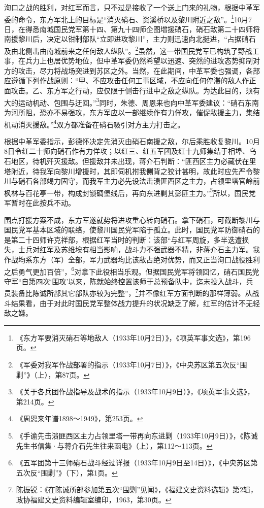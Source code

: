 洵口之战的胜利，对红军而言，只不过是接收了一个送上门来的礼物，根据中革军委的命令，东方军北上的目标是“消灭硝石、资溪桥以及黎川附近之敌”。\footnote{《东方军要消灭硝石等地敌人（1933年10月2日）》，《项英军事文选》，第196页。}10月7日，在得悉南城国民党军第十四、第九十四师企图增援硝石，硝石敌第二十四师将南援黎川后，决定以钳制部队“立即进攻黎川”，主力则迅速向北挺进，“占据硝石及由北侧击由南城前来之任何敌人纵队”。\footnote{《军委对我军作战部署的指示（1933年10月7日）》，《中央苏区第五次反“围剿”》（上），第87页。}虽然，这一带国民党军已构筑了野战工事，在兵力上也居优势地位，但中革军委仍然希望以迅速、突然的进攻态势抑制对方的攻击，尽力将战场突进到苏区之外。当然，在此期间，中革军委也强调，各部应遵循下列作战原则：“甲、不应攻击任何工事区域，不应向任何停滞的敌人作正面攻击。乙、东方军之行动，应仅限于侧击行进中之敌之纵队。为达此目的，须有大的运动机动、包围与迂回。”\footnote{《关于各兵团作战指导及战术的指示（1933年10月9日）》，《项英军事文选》，第214页。}同时，朱德、周恩来也向中革军委建议：“硝石东南为河所阻，恐亦不易强攻，东方军应以一部继续作有力佯攻，催促敌援主力，集结机动消灭援敌。”\footnote{《周恩来年谱1898～1949》，第253页。}双方都准备在硝石吸引对方主力打击之。


根据中革军委指示，彭德怀决定先消灭由硝石南援之敌，尔后乘胜收复黎川。10月8日令红二十师向硝石作有力佯攻；以红三、红五军团及红十九师集结于相埠、乌石地区，待机歼灭援敌。但援敌并未出现，蒋介石判断：“匪西区主力必藏伏在里塔附近，待我军向黎川增援时，其即伺机拊我侧背之狡计甚明，故此时应先严令黎川与硝石各部竭力固守，而我军主力必先设法击溃匪西区之主力，占领里塔官岭前枫林与百花亭一带，构成封锁碉堡线后，再向东进剿其彭匪主力。”\footnote{《手谕先击溃匪西区主力占领里塔一带再向东进剿（1933年10月9日）》，《陈诚先生书信集·与蒋介石先生往来函电》（上），第112～113页。}所以，国民党军暂时在此按兵不动。


围点打援方案不成，东方军遂就势将进攻重心转向硝石。拿下硝石，可截断黎川与国民党军基本区域的联络，使黎川国民党军陷于孤立。此时，国民党军防御硝石的是第二十四师许克祥部，根据红军当时的判断：该部“与红军周旋，多半迭遭损失，士兵对红军及苏维埃有相当影响，战斗力不强武器不精，非蒋介石主力军。我作战均系东方（军）全部，军力武器均比该敌占绝对优势，而又正当洵口战役胜利之后勇气更加百倍”，\footnote{《五军团第十三师硝石战斗经过详报（1933年10月9日至14日）》，《中央苏区第五次反“围剿”》（下），第1页。}对拿下此役相当乐观。但据国民党军将领回忆，硝石国民党守军“自第四次‘围攻’以来，陈就始终控置该师于总预备队中，迄末投入战斗，兵员装备比陈诚所部其它部队亦较为完整”，\footnote{陈振锐：《在陈诚所部参加第五次“围剿”见闻》，《福建文史资料选辑》第2辑，政协福建文史资料编辑室编印，1963，第30页。}并不像红军方面判断的那样薄弱。从战斗结果看，由于对此时国民党军整体战力提升的状况缺乏了解，红军的估计不无轻敌之嫌。


